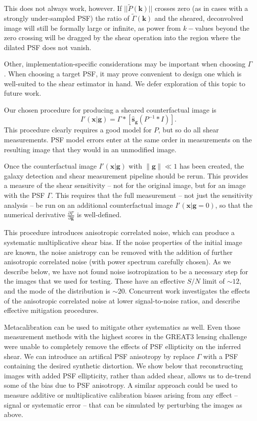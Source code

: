 \documentclass[iop]{emulateapj}
\begin{document}
This does not always work, however. If $||\tilde{P}(\mathbf{k})||$
crosses zero (as in cases with a strongly under-sampled PSF) the
ratio of $\tilde{\Gamma}(\mathbf{k})$ and the sheared, deconvolved
image will still be formally large or infinite, as power from
$k-$values beyond the zero crossing will be dragged by the shear
operation into the region where the dilated PSF does not vanish.

Other, implementation-specific considerations may be important when
choosing $\Gamma$. When choosing a target PSF, it may prove convenient
to design one which is well-suited to the shear estimator in hand. We
defer exploration of this topic to future work.

Our chosen procedure for producing a sheared counterfactual image is
\begin{equation}
I'({\mathbf{x}}|\mathbf{g}) = \Gamma \ast \left[\hat{\mathbf{s}}_\mathbf{g} \left(P^{-1} \ast I \right)\right].
\end{equation}
This procedure clearly requires a good model for $P$, but so do all
shear measurements. PSF model errors enter at the
same order in measurements on the resulting image that they would in
an unmodified image.

Once the counterfactual image $I'(\mathbf{x}|\mathbf{g})$ with
$\|\mathbf{g}\| \ll 1$ has been created, the galaxy detection and
shear measurement pipeline should be rerun. This provides a measure of
the shear sensitivity -- not for the original image, but for an image
with the PSF $\Gamma$. This requires that the full measurement -- not
just the sensitivity analysis -- be run on an additional
counterfactual image $I'(\mathbf{x}|\mathbf{g}=0)$, so that the numerical
derivative $\frac{\partial I'}{\partial \mathbf{g}}$ is well-defined.

This procedure introduces anisotropic correlated noise, which can
produce a systematic multiplicative shear bias. If the noise
properties of the initial image are known, the noise anistropy can be
removed with the addition of further anisotropic correlated noise
(with power spectrum carefully chosen). As we describe below, we have
not found noise isotropization to be a necessary step for the images
that we used for testing.  These have an effective $S/N$ limit of
$\sim 12$, and the mode of the distribution is $\sim20$. Concurrent
work \citep{metacalII} investigates the effects of the anisotropic
correlated noise at lower signal-to-noise ratios, and describe
effective mitigation procedures.

Metacalibration can be used to mitigate other systematics as
well. Even those measurement methods with the highest scores in the
GREAT3 lensing challenge were unable to completely remove the effects
of PSF ellipticity on the inferred shear. We can introduce an
artifical PSF anisotropy by replace $\Gamma$ with a PSF containing the
desired synthetic distortion.  We show below that reconstructing
images with added PSF ellipticity, rather than added shear, allows us
to de-trend some of the bias due to PSF anisotropy. A similar approach
could be used to measure additive or multiplicative calibration biases
arising from any effect -- signal or systematic error -- that can be
simulated by perturbing the images as above.
\end{document}
